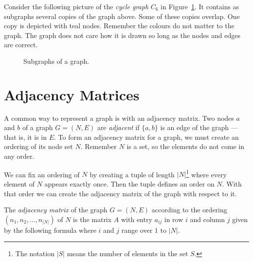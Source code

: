 \documentclass{iansnotes}
\begin{document}
  Consider the following picture of the \emph{cycle graph} $C_6$ in Figure~\ref{figure:subgraphs}.
  It contains as subgraphs several copies of the graph above.
  Some of these copies overlap.
  One copy is depicted with teal nodes.
  Remember the colours do not matter to the graph.
  The graph does not care how it is drawn so long as the nodes and edges are correct.
  \begin{figure}
    \centering
    \caption{Subgraphs of a graph.}
    \label{figure:subgraphs}
  \end{figure}

\section{Adjacency Matrices}
  A common way to represent a graph is with an adjacency matrix.
  Two nodes $a$ and $b$ of a graph $G = (N, E)$ are \emph{adjacent} if $\{a,b\}$ is an edge of the graph --- that is, it is in $E$.
  To form an adjacency matrix for a graph, we must create an ordering of its node set $N$.
  Remember $N$ is a set, so the elements do not come in any order.
  
  We can fix an ordering of $N$ by creating a tuple of length $|N|$\footnote{The notation $|S|$ means the number of elements in the set $S$.} where every element of $N$ appears exactly once.
  Then the tuple defines an order on $N$.
  With that order we can create the adjacency matrix of the graph with respect to it.

  The \emph{adjacency matrix} of the graph $G = (N, E)$ according to the ordering $(n_1, n_2, \ldots, n_{|N|})$ of $N$ is the matrix $A$ with entry $a_{ij}$ in row $i$ and column $j$ given by the following formula where $i$ and $j$ range over $1$ to $|N|$.
  
\end{document}
